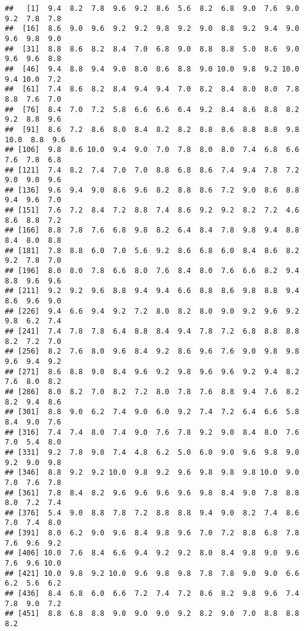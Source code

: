\documentclass[
]{article}
\begin{document}
\begin{verbatim}
##   [1]  9.4  8.2  7.8  9.6  9.2  8.6  5.6  8.2  6.8  9.0  7.6  9.0  9.2  7.8  7.8
##  [16]  8.6  9.0  9.6  9.2  9.2  9.8  9.2  9.0  8.8  9.2  9.4  9.0  9.6  9.8  9.0
##  [31]  8.8  8.6  8.2  8.4  7.0  6.8  9.0  8.8  8.8  5.0  8.6  9.0  9.6  9.6  8.8
##  [46]  9.4  8.8  9.4  9.0  8.0  8.6  8.8  9.0 10.0  9.8  9.2 10.0  9.4 10.0  7.2
##  [61]  7.4  8.6  8.2  8.4  9.4  9.4  7.0  8.2  8.4  8.0  8.0  7.8  8.8  7.6  7.0
##  [76]  8.4  7.0  7.2  5.8  6.6  6.6  6.4  9.2  8.4  8.6  8.8  8.2  9.2  8.8  9.6
##  [91]  8.6  7.2  8.6  8.0  8.4  8.2  8.2  8.8  8.6  8.8  8.8  9.8 10.0  8.8  9.6
## [106]  9.8  8.6 10.0  9.4  9.0  7.0  7.8  8.0  8.0  7.4  6.8  6.6  7.6  7.8  6.8
## [121]  7.4  8.2  7.4  7.0  7.0  8.8  6.8  8.6  7.4  9.4  7.8  7.2  9.0  9.0  9.6
## [136]  9.6  9.4  9.0  8.6  9.6  8.2  8.8  8.6  7.2  9.0  8.6  8.8  9.4  9.6  7.0
## [151]  7.6  7.2  8.4  7.2  8.8  7.4  8.6  9.2  9.2  8.2  7.2  4.6  8.6  8.8  7.2
## [166]  8.8  7.8  7.6  6.8  9.8  8.2  6.4  8.4  7.8  9.8  9.4  8.8  8.4  8.0  8.8
## [181]  7.8  8.8  6.0  7.0  5.6  9.2  8.6  6.8  6.0  8.4  8.6  8.2  9.2  7.8  7.0
## [196]  8.0  8.0  7.8  6.6  8.0  7.6  8.4  8.0  7.6  6.6  8.2  9.4  8.8  9.6  9.6
## [211]  9.2  9.2  9.6  8.8  9.4  9.4  6.6  8.8  8.6  9.8  8.8  9.4  8.6  9.6  9.0
## [226]  9.4  6.6  9.4  9.2  7.2  8.0  8.2  8.0  9.0  9.2  9.6  9.2  9.8  6.2  7.4
## [241]  7.4  7.8  7.8  6.4  8.8  8.4  9.4  7.8  7.2  6.8  8.8  8.8  8.2  7.2  7.0
## [256]  8.2  7.6  8.0  9.6  8.4  9.2  8.6  9.6  7.6  9.0  9.8  9.8  9.6  9.4  9.2
## [271]  8.6  8.8  9.0  8.4  9.6  9.2  9.8  9.6  9.6  9.2  9.4  8.2  7.6  8.0  8.2
## [286]  8.0  8.2  7.0  8.2  7.2  8.0  7.8  7.6  8.8  9.4  7.6  8.2  8.2  9.4  8.6
## [301]  8.8  9.0  6.2  7.4  9.0  6.0  9.2  7.4  7.2  6.4  6.6  5.8  8.4  9.0  7.6
## [316]  7.4  7.4  8.0  7.4  9.0  7.6  7.8  9.2  9.0  8.4  8.0  7.6  7.0  5.4  8.0
## [331]  9.2  7.8  9.0  7.4  4.8  6.2  5.0  6.0  9.0  9.6  9.8  9.0  9.2  9.0  9.8
## [346]  8.8  9.2  9.2 10.0  9.8  9.2  9.6  9.8  9.8  9.8 10.0  9.0  7.0  7.6  7.8
## [361]  7.8  8.4  8.2  9.6  9.6  9.6  9.6  9.8  8.4  9.0  7.8  8.8  8.0  7.2  7.4
## [376]  5.4  9.0  8.8  7.8  7.2  8.8  8.8  9.4  9.0  8.2  7.4  8.6  7.0  7.4  8.0
## [391]  8.0  6.2  9.0  9.6  8.4  9.8  9.6  7.0  7.2  8.8  6.8  7.8  7.6  9.6  9.2
## [406] 10.0  7.6  8.4  6.6  9.4  9.2  9.2  8.0  8.4  9.8  9.0  9.6  7.6  9.6 10.0
## [421] 10.0  9.8  9.2 10.0  9.6  9.8  9.8  7.8  7.8  9.0  9.0  6.6  6.2  5.6  6.2
## [436]  8.4  6.8  6.0  6.6  7.2  7.4  7.2  8.6  8.2  9.8  9.6  7.4  7.8  9.0  7.2
## [451]  8.8  6.8  8.8  9.0  9.0  9.0  9.2  8.2  9.0  7.0  8.8  8.8  8.2
\end{verbatim}
\end{document}

